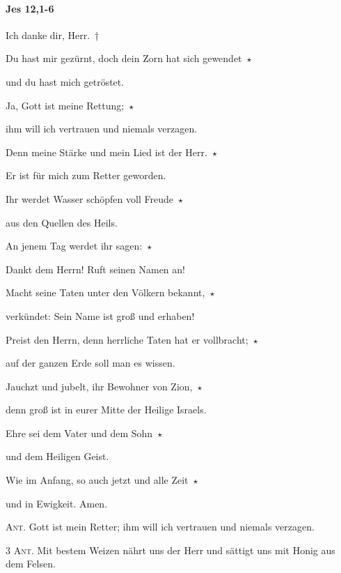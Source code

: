 \paragraph{Jes 12,1-6}

\noindent Ich danke dir, Herr.~†~\nopagebreak

Du hast mir gezürnt, doch dein Zorn hat sich gewendet~$\star$~\nopagebreak

und du hast mich getröstet.

\noindent Ja, Gott ist meine Rettung;~$\star$~\nopagebreak

ihm will ich vertrauen und niemals verzagen.

\noindent Denn meine Stärke und mein Lied ist der Herr.~$\star$~\nopagebreak

Er ist für mich zum Retter geworden.

\noindent Ihr werdet Wasser schöpfen voll Freude~$\star$~\nopagebreak

aus den Quellen des Heils.

\noindent An jenem Tag werdet ihr sagen:~$\star$~\nopagebreak

Dankt dem Herrn! Ruft seinen Namen an!

\noindent Macht seine Taten unter den Völkern bekannt,~$\star$~\nopagebreak

verkündet: Sein Name ist groß und erhaben!

\noindent Preist den Herrn, denn herrliche Taten hat er vollbracht;~$\star$~\nopagebreak

auf der ganzen Erde soll man es wissen.

\noindent Jauchzt und jubelt, ihr Bewohner von Zion,~$\star$~\nopagebreak

denn groß ist in eurer Mitte der Heilige Israels.

\noindent Ehre sei dem Vater und dem Sohn~$\star$~\nopagebreak

und dem Heiligen Geist.

\noindent Wie im Anfang, so auch jetzt und alle Zeit~$\star$~\nopagebreak

und in Ewigkeit. Amen.

\vspace{10pt}

\noindent \textsc{Ant.} Gott ist mein Retter; ihm will ich vertrauen und niemals verzagen. 

\vspace{10pt}

\noindent \textsc{3 Ant.} Mit bestem Weizen nährt uns der Herr und sättigt uns mit Honig aus dem Felsen.

